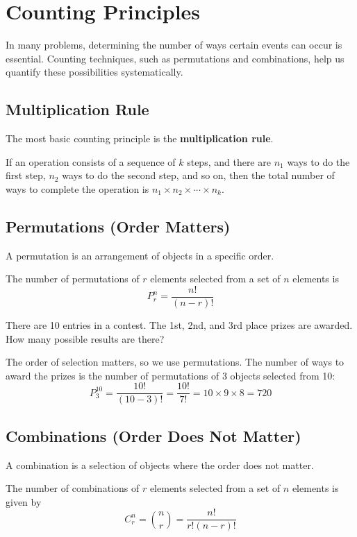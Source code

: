 \section{Counting Principles}
In many problems, determining the number of ways certain events can occur is essential. Counting techniques, such as permutations and combinations, help us quantify these possibilities systematically.

\subsection*{Multiplication Rule}
The most basic counting principle is the \textbf{multiplication rule}.
\begin{theorem}
    If an operation consists of a sequence of $k$ steps, and there are $n_1$ ways to do the first step, $n_2$ ways to do the second step, and so on, then the total number of ways to complete the operation is $n_1 \times n_2 \times \cdots \times n_k$.
\end{theorem}

\subsection*{Permutations (Order Matters)}
A permutation is an arrangement of objects in a specific order.
\begin{definition}
    The number of permutations of $r$ elements selected from a set of $n$ elements is
    \[ P_r^n = \frac{n!}{(n-r)!} \]
\end{definition}

\begin{example}
    There are 10 entries in a contest. The 1st, 2nd, and 3rd place prizes are awarded. How many possible results are there?
\end{example}
\begin{solution}
    The order of selection matters, so we use permutations. The number of ways to award the prizes is the number of permutations of 3 objects selected from 10:
    \[ P_3^{10} = \frac{10!}{(10-3)!} = \frac{10!}{7!} = 10 \times 9 \times 8 = 720 \]
\end{solution}

\subsection*{Combinations (Order Does Not Matter)}
A combination is a selection of objects where the order does not matter.
\begin{definition}[Combinations]
    The number of combinations of $r$ elements selected from a set of $n$ elements is given by
    \[ C_r^n = \binom{n}{r} = \frac{n!}{r!(n-r)!} \]
\end{definition}


